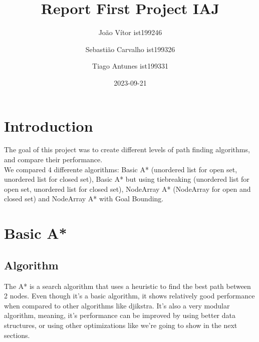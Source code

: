 \documentclass{article}
\title{Report First Project IAJ}
\author{João Vítor ist199246
  \and Sebastião Carvalho ist199326
  \and Tiago Antunes ist199331}
\date{2023-09-21}
\begin{document}
  \maketitle
  \section{Introduction}
  The goal of this project was to create different levels of path finding algorithms, and compare their performance.\\
  We compared 4 differente algorithms: Basic A* (unordered list for open set, unordered list for closed set), Basic A* but using tiebreaking 
  (unordered list for open set, unordered list for closed set), NodeArray A* (NodeArray for open and closed set) 
  and NodeArray A* with Goal Bounding.\\
  \section{Basic A*}
  \subsection{Algorithm}
  The A* is a search algorithm that uses a heuristic to find the best path between 2 nodes. Even though it's a basic algorithm, it shows relatively good 
  performance when compared to other algorithms like djikstra. It's also a very modular algorithm, meaning, it's performance can be improved by using better data structures,
  or using other optimizations like we're going to show in the next sections.\\
\end{document}
